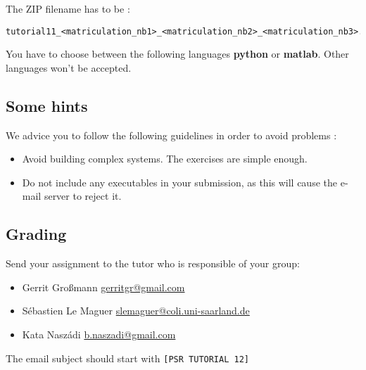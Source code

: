 \documentclass[a4paper,12pt]{article}
\begin{document}
The ZIP filename has to be :

\begin{verbatim}
tutorial11_<matriculation_nb1>_<matriculation_nb2>_<matriculation_nb3>.zip
\end{verbatim}

You have to choose between the following languages \textbf{python} or \textbf{matlab}. Other languages won't be accepted.

\subsection*{Some hints}
\label{sec:some-advices}

We advice you to follow the following guidelines in order to avoid problems :
\begin{itemize}
    \item Avoid building complex systems. The exercises are simple enough.
    \item Do not include any executables in your submission, as this will cause the e-mail server to reject it.
\end{itemize}

\subsection*{Grading}
\label{sec:grading}

Send your assignment to the tutor who is responsible of your group:
\begin{itemize}
    \item Gerrit Großmann \url{gerritgr@gmail.com}
    \item Sébastien Le Maguer \url{slemaguer@coli.uni-saarland.de}
    \item Kata Naszádi \url{b.naszadi@gmail.com}
\end{itemize}

The email subject should start with \verb|[PSR TUTORIAL 12]|
\end{document}
